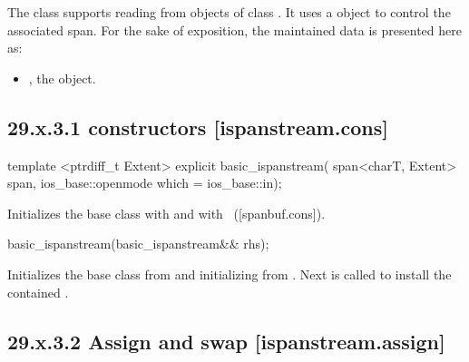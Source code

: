 \documentclass[ebook,11pt,article]{memoir}
\renewcommand{\iref}[1]{[#1]}
\begin{document}
\pnum
The class
supports reading from objects of class
.
It uses a
object to control the associated span.
For the sake of exposition, the maintained data is presented here as:
\begin{itemize}
\item
{}, the  object.
\end{itemize}

\subsection{29.x.3.1  constructors [ispanstream.cons]}
\label{ispanstream.cons}

\begin{itemdecl}
template <ptrdiff_t Extent>
explicit basic_ispanstream(
  span<charT, Extent> span,
  ios_base::openmode which = ios_base::in);
\end{itemdecl}

\begin{itemdescr}
\pnum
\effects
Initializes the base class with
and  with
~(\iref{spanbuf.cons}).
\end{itemdescr}

\begin{itemdecl}
basic_ispanstream(basic_ispanstream&& rhs);
\end{itemdecl}

\begin{itemdescr}
\pnum
\effects 
Initializes the base class from  
and initializing  from .
Next  is called to
install the contained .
\end{itemdescr}

\subsection{29.x.3.2 Assign and swap [ispanstream.assign]}
\label{ispanstream.assign}
\end{document}
